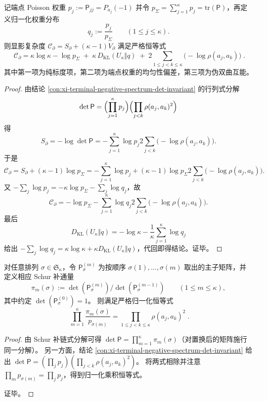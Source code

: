 \begin{conclusion}\label{con:xi-terminal-pick-poisson-visibility-complexity-kl-energy-split}
记端点 Poisson 权重
\(
p_j:=\mathsf P_{jj}=P_{a_j}(-1)
\)
并令 \(p_\Sigma=\sum_{j=1}^{\kappa}p_j=\mathrm{tr}(\mathsf P)\)，再定义归一化权重分布
\[
q_j:=\frac{p_j}{p_\Sigma}\qquad(1\le j\le\kappa).
\]
则显影复杂度
\(
\mathscr{C}_{\partial}=S_{\partial}+(\kappa-1)V_{\partial}
\)
满足严格恒等式
\[
\boxed{\;
\mathscr{C}_{\partial}
=\kappa\log\kappa-\log p_\Sigma
\;+\;\kappa\,D_{\mathrm{KL}}(U_\kappa\Vert q)
\;+\;2\sum_{1\le j<k\le\kappa}\bigl(-\log\rho(a_j,a_k)\bigr)\; } .
\]
其中第一项为纯标度项，第二项为端点权重的均匀性偏差，第三项为伪双曲互能。
\end{conclusion}
\begin{proof}
由结论 \ref{con:xi-terminal-negative-spectrum-det-invariant} 的行列式分解
\[
\det\mathsf P=\Bigl(\prod_{j=1}^{\kappa}p_j\Bigr)\Bigl(\prod_{j<k}\rho(a_j,a_k)^2\Bigr)
\]
得
\[
S_{\partial}=-\log\det\mathsf P
=-\sum_{j=1}^{\kappa}\log p_j
2\sum_{j<k}\bigl(-\log\rho(a_j,a_k)\bigr).
\]
于是
\[
\mathscr{C}_{\partial}
=S_{\partial}+(\kappa-1)\log p_\Sigma
=-\sum_{j=1}^{\kappa}\log p_j+(\kappa-1)\log p_\Sigma
2\sum_{j<k}\bigl(-\log\rho(a_j,a_k)\bigr).
\]
又 \(-\sum_j\log p_j=-\kappa\log p_\Sigma-\sum_j\log q_j\)，故
\[
\mathscr{C}_{\partial}
=-\log p_\Sigma-\sum_{j=1}^{\kappa}\log q_j
2\sum_{j<k}\bigl(-\log\rho(a_j,a_k)\bigr).
\]
最后
\[
D_{\mathrm{KL}}(U_\kappa\Vert q)
=-\log\kappa-\frac1\kappa\sum_{j=1}^{\kappa}\log q_j
\]
给出 \(-\sum_j\log q_j=\kappa\log\kappa+\kappa D_{\mathrm{KL}}(U_\kappa\Vert q)\)，代回即得结论。证毕。
\end{proof}

\begin{conclusion}\label{con:xi-terminal-pick-poisson-schur-vandermonde-externalization}
对任意排列 \(\sigma\in\mathfrak S_\kappa\)，令 \(\mathsf P^{(m)}_\sigma\) 为按顺序 \(\sigma(1),\dots,\sigma(m)\) 取出的主子矩阵，并定义相应 Schur 补通量
\[
\pi_m(\sigma)
:=\det(\mathsf P^{(m)}_\sigma)\Big/\det(\mathsf P^{(m-1)}_\sigma)
\qquad(1\le m\le\kappa),
\]
其中约定 \(\det(\mathsf P^{(0)}_\sigma)=1\)。
则满足严格归一化恒等式
\[
\boxed{\;
\prod_{m=1}^{\kappa}\frac{\pi_m(\sigma)}{p_{\sigma(m)}}
=\prod_{1\le j<k\le\kappa}\rho(a_j,a_k)^2\; } .
\]
\end{conclusion}
\begin{proof}
由 Schur 补链式分解可得 \(\det\mathsf P=\prod_{m=1}^{\kappa}\pi_m(\sigma)\)（对置换后的矩阵施行同一分解）。
另一方面，结论 \ref{con:xi-terminal-negative-spectrum-det-invariant} 给出
\(
\det\mathsf P=(\prod_j p_j)(\prod_{j<k}\rho(a_j,a_k)^2)
\)。
将两式相除并注意 \(\prod_m p_{\sigma(m)}=\prod_j p_j\)，得到归一化乘积恒等式。
\par
证毕。
\end{proof}

